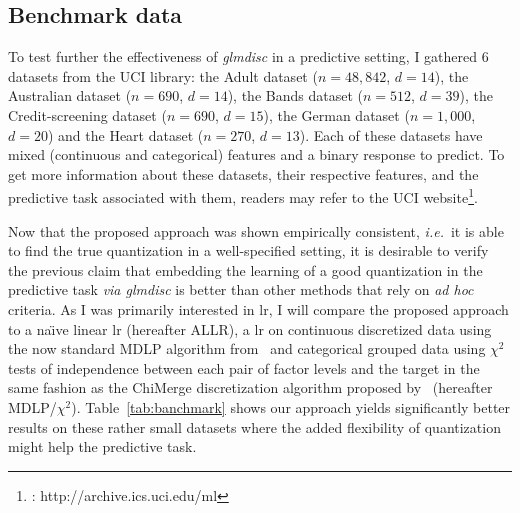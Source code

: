 \subsection{Benchmark data} \label{subsec:exp_benchmark}

To test further the effectiveness of \textit{glmdisc} in a predictive setting, I gathered 6 datasets from the UCI library: the Adult dataset ($n=48,842$, $d=14$), the Australian dataset ($n=690$, $d=14$), the Bands dataset ($n=512$, $d=39$), the Credit-screening dataset ($n=690$, $d=15$), the German dataset ($n=1,000$, $d=20$) and the Heart dataset ($n=270$, $d=13$). Each of these datasets have mixed (continuous and categorical) features and a binary response to predict. To get more information about these datasets, their respective features, and the predictive task associated with them, readers may refer to the UCI website\footnote{\cite{Dua:2017} : http://archive.ics.uci.edu/ml}.

Now that the proposed approach was shown empirically consistent, \textit{i.e.}\ it is able to find the true quantization in a well-specified setting, it is desirable to verify the previous claim that embedding the learning of a good quantization in the predictive task \textit{via glmdisc} is better than other methods that rely on \textit{ad hoc} criteria. As I was primarily interested in \gls{lr}, I will compare the proposed approach to a na\"{\i}ve linear \gls{lr} (hereafter ALLR), a \gls{lr} on continuous discretized data using the now standard MDLP algorithm from~\cite{fayyad1993multi} and categorical grouped data using $\chi^2$ tests of independence between each pair of factor levels and the target in the same fashion as the ChiMerge discretization algorithm proposed by~\cite{kerber1992chimerge} (hereafter MDLP/$\chi^2$). Table~\ref{tab:banchmark} shows our approach yields significantly better results on these rather small datasets where the added flexibility of quantization might help the predictive task.

